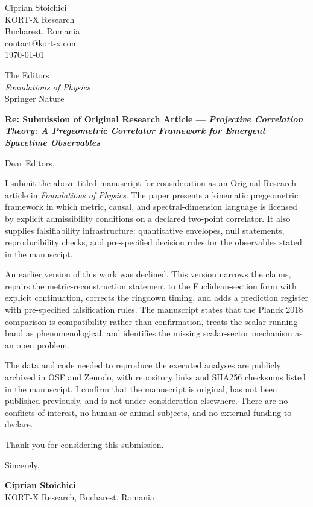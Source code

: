 \documentclass[12pt,a4paper]{article}
\begin{document}
\begin{flushright}
Ciprian Stoichici \\
KORT-X Research \\
Bucharest, Romania \\
contact@kort-x.com \\
\today
\end{flushright}

\vspace{0.5em}

\noindent
The Editors \\
\textit{Foundations of Physics} \\
Springer Nature

\vspace{1em}

\noindent
\textbf{Re: Submission of Original Research Article --- \textit{Projective Correlation Theory: A Pregeometric Correlator Framework for Emergent Spacetime Observables}}

\vspace{0.5em}

\noindent Dear Editors,

I submit the above-titled manuscript for consideration as an Original Research article in \textit{Foundations of Physics}. The paper presents a kinematic pregeometric framework in which metric, causal, and spectral-dimension language is licensed by explicit admissibility conditions on a declared two-point correlator. It also supplies falsifiability infrastructure: quantitative envelopes, null statements, reproducibility checks, and pre-specified decision rules for the observables stated in the manuscript.

An earlier version of this work was declined. This version narrows the claims, repairs the metric-reconstruction statement to the Euclidean-section form with explicit continuation, corrects the ringdown timing, and adds a prediction register with pre-specified falsification rules. The manuscript states that the Planck 2018 comparison is compatibility rather than confirmation, treats the scalar-running band as phenomenological, and identifies the missing scalar-sector mechanism as an open problem.

The data and code needed to reproduce the executed analyses are publicly archived in OSF and Zenodo, with repository links and SHA256 checksums listed in the manuscript. I confirm that the manuscript is original, has not been published previously, and is not under consideration elsewhere. There are no conflicts of interest, no human or animal subjects, and no external funding to declare.

Thank you for considering this submission.

\vspace{1em}

\noindent Sincerely,

\vspace{1.5em}

\noindent \textbf{Ciprian Stoichici} \\
KORT-X Research, Bucharest, Romania
\end{document}
